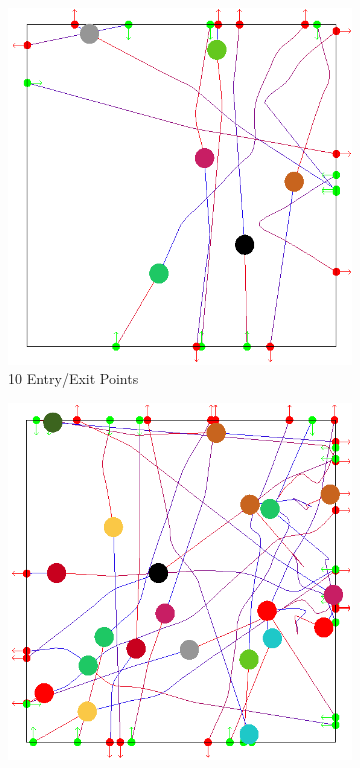 \begin{figure}[t]
 \centering
%
\begin{subfigure}[b]{0.24\linewidth}
	\includegraphics[width=\linewidth]{images/res-10-entry-exit.png}
	\caption{10 Entry/Exit Points}
 \end{subfigure}
%
 \begin{subfigure}[b]{0.24\linewidth}
	\includegraphics[width=\linewidth]{images/res-20-entry-exit.png}

\end{subfigure}
\end{figure}
